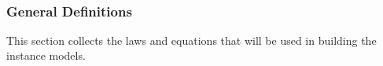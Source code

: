\documentclass[12pt]{article}
\newcommand{\colAwidth}{0.13\textwidth}
\newcommand{\colBwidth}{0.82\textwidth}
\newcounter{defnum} %
\newcommand{\ddref}[1]{DD\ref{#1}}
\newcommand{\aref}[1]{A\ref{#1}}
\begin{document}
~\newline

\subsubsection{General Definitions}\label{sec_gendef}


This section collects the laws and equations that will be used in building the
instance models.



\end{document}
